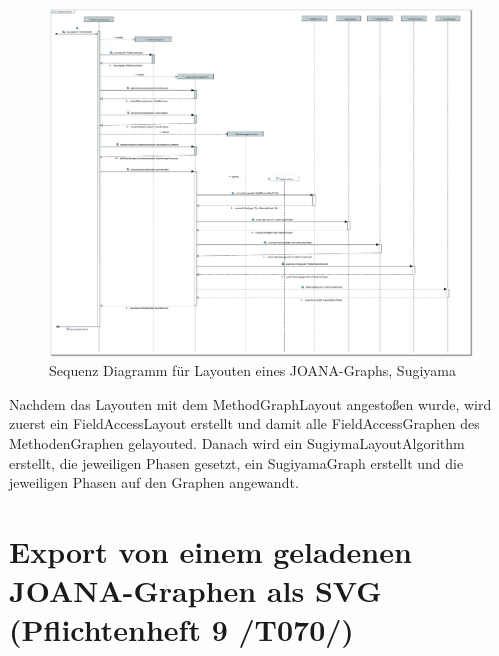 \begin{figure}[!htbp]
	\centering
	\includegraphics[width=450pt]{resourcen/SeqDiagramSugiyama.PDF}
	\caption{Sequenz Diagramm für Layouten eines JOANA-Graphs, Sugiyama}
	\label{fig:seq:layoutSugi}
\end{figure}

Nachdem das Layouten mit dem MethodGraphLayout angestoßen wurde, wird zuerst ein FieldAccessLayout erstellt und damit alle FieldAccessGraphen des MethodenGraphen gelayouted. Danach wird ein SugiymaLayoutAlgorithm erstellt, die jeweiligen Phasen gesetzt, ein SugiyamaGraph erstellt und die jeweiligen Phasen auf den Graphen angewandt.

\newpage
\section{Export von einem geladenen JOANA-Graphen als SVG (Pflichtenheft 9 /T070/)}